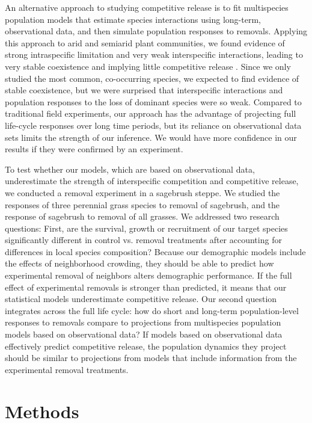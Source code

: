\documentclass[11pt]{article}
\begin{document}
\begin{doublespacing}
An alternative approach to studying competitive release is to fit multispecies population models that estimate species interactions using long-term, observational data, and then simulate population responses to removals. Applying this approach to arid and semiarid plant communities, we found evidence of strong intraspecific limitation and very weak interspecific interactions, leading to very stable coexistence and implying little competitive release \citep{adler_coexistence_2010,chu_large_2015}. Since we only studied the most common, co-occurring species, we expected to find evidence of stable coexistence, but we were surprised that interspecific interactions and population responses to the loss of dominant species were so weak. Compared to traditional field experiments, our approach has the advantage of projecting full life-cycle responses over long time periods, but its reliance on observational data sets limits the strength of our inference. We would have more confidence in our results if they were confirmed by an experiment.

To test whether our models, which are based on observational data, underestimate the strength of interspecific competition and competitive release, we conducted a removal experiment in a sagebrush steppe. We studied the responses of three perennial grass species to removal of sagebrush, and the response of sagebrush to removal of all grasses. We addressed two research questions: First, are the survival, growth or recruitment of our target species significantly different in control vs. removal treatments after accounting for differences in local species composition? Because our demographic models include the effects of neighborhood crowding, they should be able to predict how experimental removal of neighbors alters demographic performance. If the full effect of experimental removals is stronger than predicted, it means that our statistical models underestimate competitive release.  Our second question integrates across the full life cycle: how do short and long-term population-level responses to removals compare to projections from multispecies population models based on observational data? If models based on observational data effectively predict competitive release, the population dynamics they project should be similar to projections from models that include information from the experimental removal treatments. 

\section*{Methods}


\end{doublespacing}
\end{document}
